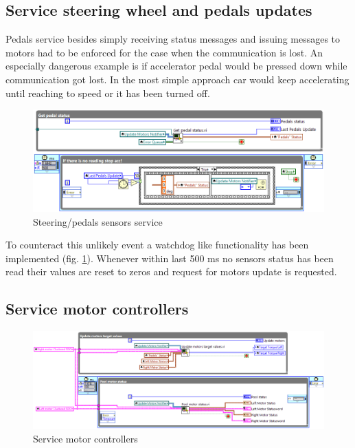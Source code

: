 \subsection{Service steering wheel and pedals updates}
Pedals service besides simply receiving status messages and issuing messages to motors had to be enforced for the case when the communication is lost. An especially dangerous example is if accelerator pedal would be pressed down while communication got lost.
In the most simple approach car would keep accelerating until reaching to speed or it has been turned off.
\begin{figure}[H]
    \centering
    \includegraphics[scale=\visc,max width=\textwidth]{figures/Pedals_status}
    \caption{Steering/pedals sensors service}
    \label{pedals_service}
\end{figure}
To counteract this unlikely event a watchdog like functionality has been implemented (fig. \ref{pedals_service}). Whenever within last 500 ms no sensors status has been read their values are reset to zeros and request for motors update is requested.

\subsection{Service motor controllers}
\begin{figure}[H]
    \centering
    \includegraphics[scale=\visc,max width=\textwidth]{figures/Run_maind1_e}
    \caption{Service motor controllers}
    \label{s_m_c}
\end{figure}
